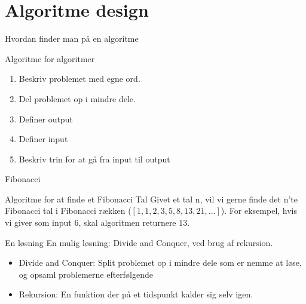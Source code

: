 \documentclass[12pt,t]{beamer}
\begin{document}
\section{Algoritme design}
    \begin{frame}[c]{Hvordan finder man på en algoritme}
        \begin{block}{Algoritme for algoritmer}
            \begin{enumerate}
                \item Beskriv problemet med egne ord. \pause
                \item Del problemet op i mindre dele. \pause
                \item Definer output \pause
                \item Definer input \pause
                \item Beskriv trin for at gå fra input til output
            \end{enumerate}
        \end{block}
    \end{frame}

    \begin{frame}{Fibonacci}
    \begin{exampleblock}{Algoritme for at finde et Fibonacci Tal}
        Givet et tal n, vil vi gerne finde det n'te Fibonacci tal i 
        Fibonacci rækken ($[1, 1, 2, 3, 5, 8, 13, 21, ...]$). For eksempel, 
        hvis vi giver som input $6$, skal algoritmen returnere $13$.
    \end{exampleblock}
    \begin{block}{En løsning}
        En mulig løsning: Divide and Conquer, ved brug af rekursion.\pause\\
        \begin{itemize}
        \item Divide and Conquer: Split problemet op i mindre dele som er nemme at 
              løse, og opsaml problemerne efterfølgende
        \pause
        \item Rekursion: En funktion der på et tidspunkt kalder sig selv igen.
        \end{itemize}
        \pause
    \end{block}
    \end{frame}
\end{document}
